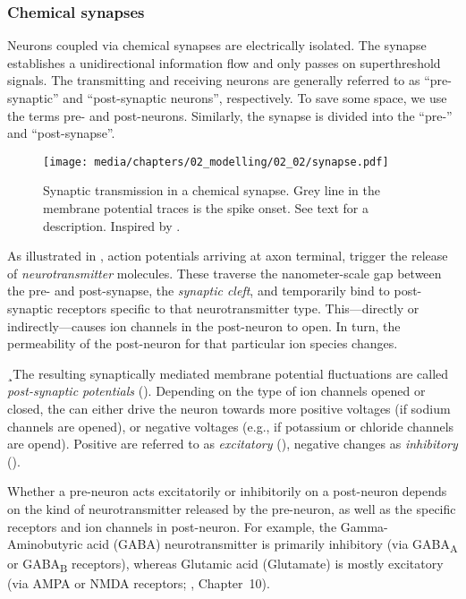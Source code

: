 \subsubsection{Chemical synapses}
Neurons coupled via chemical synapses are electrically isolated.
The synapse establishes a unidirectional information flow and only passes on superthreshold signals.
The transmitting and receiving neurons are generally referred to as \enquote{pre-synaptic} and \enquote{post-synaptic neurons}, respectively.
To save some space, we use the terms pre- and post-neurons.
Similarly, the synapse is divided into the \enquote{pre-} and \enquote{post-synapse}.

\begin{figure}
	\texttt{[image: media/chapters/02\_modelling/02\_02/synapse.pdf]}%
	\caption[Synaptic transmission in a chemical synapse]{Synaptic transmission in a chemical synapse. Grey line in the membrane potential traces is the spike onset. See text for a description. Inspired by \citet[Figure~8-8B-C, p.~185]{kandel2012principles}.}
	\label{fig:synapse}
\end{figure}

As illustrated in , action potentials arriving at axon terminal, trigger the release of \emph{neurotransmitter} molecules.
These traverse the nanometer-scale gap between the pre- and post-synapse, the \emph{synaptic cleft}, and temporarily bind to post-synaptic receptors specific to that neurotransmitter type.
This---directly or indirectly---causes ion channels in the post-neuron to open.
In turn, the permeability of the post-neuron for that particular ion species changes.

¸The resulting synaptically mediated membrane potential fluctuations are called \emph{post-synaptic potentials} (\PSPpl).
Depending on the type of ion channels opened or closed, the \PSP can either drive the neuron towards more positive voltages (if sodium channels are opened), or negative voltages (e.g., if potassium or chloride channels are opend).
Positive \PSPpl are referred to as \emph{excitatory} (\EPSP), negative changes as \emph{inhibitory} (\IPSP).

Whether a pre-neuron acts excitatorily or inhibitorily on a post-neuron depends on the kind of neurotransmitter released by the pre-neuron, as well as the specific receptors and ion channels in post-neuron.
For example, the Gamma-Aminobutyric acid (GABA) neurotransmitter is primarily inhibitory (via GABA\textsubscript{A} or GABA\textsubscript{B} receptors), whereas Glutamic acid (Glutamate) is mostly excitatory (via AMPA or NMDA receptors; \cite{kandel2012principles}, Chapter~10).

